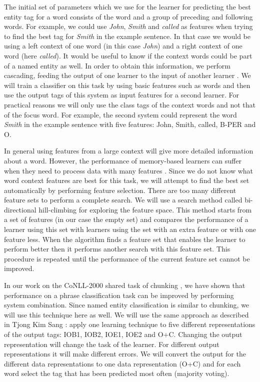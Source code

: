 \documentclass[10pt]{article}
\begin{document}
The initial set of parameters which we use for the learner for
predicting the best entity tag for a word consists of the word and a
group of preceding and following words.
For example, we could use {\it John}, {\it Smith} and {\it called}
as features when trying to find the best tag for {\it Smith} in the
example sentence.
In that case we would be using a left context of one word (in this
case {\it John}) and a right context of one word (here {\it called}).
It would be useful to know if the context words could be part of a
named entity as well.
In order to obtain this information, we perform {\sc cascading},
feeding the output of one learner to the input of another learner
\cite{veenstra98}.
We will train a classifier on this task by using basic features such
as words and then use the output tags of this system as input features
for a second learner.
For practical reasons we will only use the class tags of the context
words and not that of the focus word.
For example, the second system could represent the word {\it Smith}
in the example sentence with five features: 
John, Smith, called, B-PER and O.

In general using features from a large context will give more
detailed information about a word.
However, the performance of memory-based learners can suffer when they
need to process data with many features \cite{tks2002jmlr}.
Since we do not know what word context features are best for this
task, we will attempt to find the best set automatically by performing
{\sc feature selection}.
There are too many different feature sets to perform a complete
search.
We will use a search method called bi-directional hill-climbing
\cite{caruana94} for exploring the feature space.
This method starts from a set of features (in our case the empty set)
and compares the performance of a learner using this set with learners
using the set with an extra feature or with one feature less.
When the algorithm finds a feature set that enables the learner to
perform better then it performs another search with this feature set.
This procedure is repeated until the performance of the current
feature set cannot be improved.

In our work on the CoNLL-2000 shared task of chunking
\cite{tks2002jmlr}, we have shown that performance on a phrase
classification task can be improved by performing {\sc system
combination}.
Since named entity classification is similar to chunking, we will use
this technique here as well.
We will use the same approach as described in Tjong Kim Sang
: apply one learning technique to five
different representations of the output tags: IOB1, IOB2, IOE1, IOE2
and O+C.
Changing the output representation will change the task of the
learner.
For different output representations it will make different errors.
We will convert the output for the different data representations to 
one data representation (O+C) and for each word select the
tag that has been predicted most often (majority voting).
\end{document}
